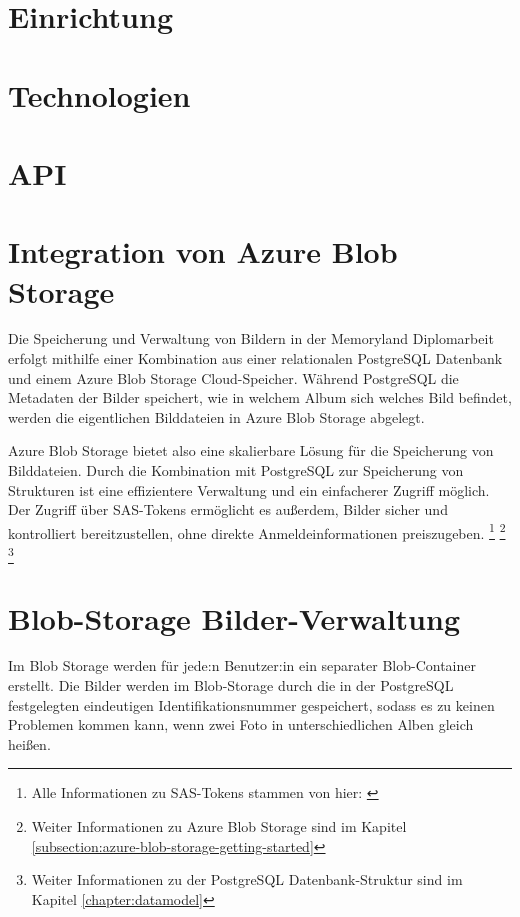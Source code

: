 
\section{Einrichtung}


\section{Technologien}


\section{API}


\section{Integration von Azure Blob Storage}

Die Speicherung und Verwaltung von Bildern in der Memoryland Diplomarbeit erfolgt 
mithilfe einer Kombination aus einer relationalen PostgreSQL Datenbank und einem 
Azure Blob Storage Cloud-Speicher. Während PostgreSQL die Metadaten der Bilder 
speichert, wie in welchem Album sich welches Bild befindet, werden die 
eigentlichen Bilddateien in Azure Blob Storage abgelegt.

Azure Blob Storage bietet also eine skalierbare Lösung für die Speicherung 
von Bilddateien. Durch die Kombination mit PostgreSQL zur Speicherung von Strukturen 
ist eine effizientere Verwaltung und ein einfacherer Zugriff möglich. Der Zugriff 
über SAS-Tokens ermöglicht es außerdem, Bilder sicher und kontrolliert bereitzustellen, 
ohne direkte Anmeldeinformationen preiszugeben.
\footnote{Alle Informationen zu SAS-Tokens stammen von hier: \cite{MicrosoftCorporationa}}
\footnote{Weiter Informationen zu Azure Blob Storage sind im Kapitel \ref{subsection:azure-blob-storage-getting-started}}
\footnote{Weiter Informationen zu der PostgreSQL Datenbank-Struktur sind im Kapitel \ref{chapter:datamodel}}

\section{Blob-Storage Bilder-Verwaltung}

Im Blob Storage werden für jede:n Benutzer:in ein separater Blob-Container erstellt. 
Die Bilder werden im Blob-Storage durch die in der PostgreSQL festgelegten eindeutigen
Identifikationsnummer gespeichert, sodass es zu keinen Problemen kommen kann, wenn zwei
Foto in unterschiedlichen Alben gleich heißen.

